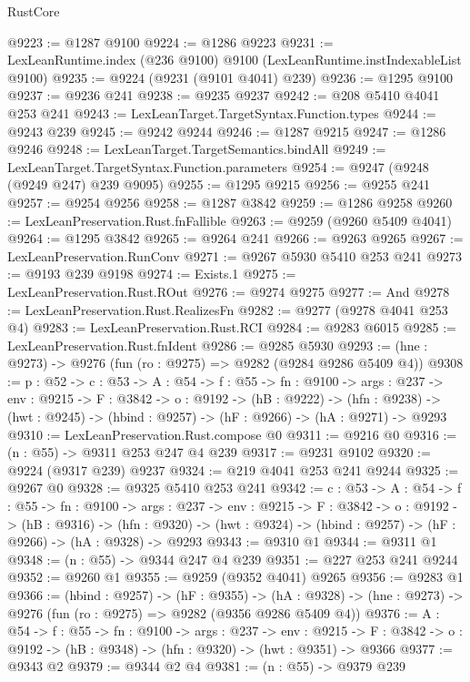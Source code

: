 \begin{lexlean}{RustCore}
\begin{coremodule}
@9223 := @1287 @9100
@9224 := @1286 @9223
@9231 := LexLeanRuntime.index (@236 @9100) @9100 (LexLeanRuntime.instIndexableList @9100)
@9235 := @9224 (@9231 (@9101 @4041) @239)
@9236 := @1295 @9100
@9237 := @9236 @241
@9238 := @9235 @9237
@9242 := @208 @5410 @4041 @253 @241
@9243 := LexLeanTarget.TargetSyntax.Function.types
@9244 := @9243 @239
@9245 := @9242 @9244
@9246 := @1287 @9215
@9247 := @1286 @9246
@9248 := LexLeanTarget.TargetSemantics.bindAll
@9249 := LexLeanTarget.TargetSyntax.Function.parameters
@9254 := @9247 (@9248 (@9249 @247) @239 @9095)
@9255 := @1295 @9215
@9256 := @9255 @241
@9257 := @9254 @9256
@9258 := @1287 @3842
@9259 := @1286 @9258
@9260 := LexLeanPreservation.Rust.fnFallible
@9263 := @9259 (@9260 @5409 @4041)
@9264 := @1295 @3842
@9265 := @9264 @241
@9266 := @9263 @9265
@9267 := LexLeanPreservation.RunConv
@9271 := @9267 @5930 @5410 @253 @241
@9273 := @9193 @239 @9198
@9274 := Exists.{1}
@9275 := LexLeanPreservation.Rust.ROut
@9276 := @9274 @9275
@9277 := And
@9278 := LexLeanPreservation.Rust.RealizesFn
@9282 := @9277 (@9278 @4041 @253 @4)
@9283 := LexLeanPreservation.Rust.RCI
@9284 := @9283 @6015
@9285 := LexLeanPreservation.Rust.fnIdent
@9286 := @9285 @5930
@9293 := (hne : @9273) -> @9276 (fun (ro : @9275) => @9282 (@9284 @9286 @5409 @4))
@9308 := {p : @52} ->
  {c : @53} ->
  {A : @54} ->
  {f : @55} ->
  {fn : @9100} ->
  {args : @237} ->
  {env : @9215} ->
  {F : @3842} ->
  {o : @9192} ->
  (hB : @9222) ->
  (hfn : @9238) -> (hwt : @9245) -> (hbind : @9257) -> (hF : @9266) -> (hA : @9271) -> @9293
@9310 := LexLeanPreservation.Rust.compose @0
@9311 := @9216 @0
@9316 := (n : @55) -> @9311 @253 @247 @4 @239
@9317 := @9231 @9102
@9320 := @9224 (@9317 @239) @9237
@9324 := @219 @4041 @253 @241 @9244
@9325 := @9267 @0
@9328 := @9325 @5410 @253 @241
@9342 := {c : @53} ->
  {A : @54} ->
  {f : @55} ->
  {fn : @9100} ->
  {args : @237} ->
  {env : @9215} ->
  {F : @3842} ->
  {o : @9192} ->
  (hB : @9316) ->
  (hfn : @9320) -> (hwt : @9324) -> (hbind : @9257) -> (hF : @9266) -> (hA : @9328) -> @9293
@9343 := @9310 @1
@9344 := @9311 @1
@9348 := (n : @55) -> @9344 @247 @4 @239
@9351 := @227 @253 @241 @9244
@9352 := @9260 @1
@9355 := @9259 (@9352 @4041) @9265
@9356 := @9283 @1
@9366 := (hbind : @9257) ->
  (hF : @9355) ->
  (hA : @9328) -> (hne : @9273) -> @9276 (fun (ro : @9275) => @9282 (@9356 @9286 @5409 @4))
@9376 := {A : @54} ->
  {f : @55} ->
  {fn : @9100} ->
  {args : @237} ->
  {env : @9215} ->
  {F : @3842} -> {o : @9192} -> (hB : @9348) -> (hfn : @9320) -> (hwt : @9351) -> @9366
@9377 := @9343 @2
@9379 := @9344 @2 @4
@9381 := (n : @55) -> @9379 @239

\end{coremodule}
\end{lexlean}
